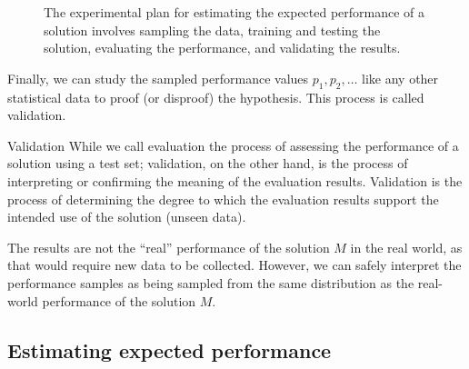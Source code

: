\begin{figure}
  \caption{
  The experimental plan for estimating the expected performance of a solution involves
  sampling the data, training and testing the solution, evaluating the performance, and
  validating the results.
  }
  \label{fig:plan-single}
\end{figure}

Finally, we can study the sampled performance values $p_1, p_2, \ldots$ like any other
statistical data to proof (or disproof) the hypothesis.  This process is called
validation.

\begin{definition}{Validation}\label{def:validation}
  While we call evaluation the process of assessing the performance of a solution using a
  test set; validation, on the other hand, is the process of interpreting or confirming
  the meaning of the evaluation results.  Validation is the process of determining the
  degree to which the evaluation results support the intended use of the solution (unseen
  data).
\end{definition}

The results are not the ``real'' performance of the solution
$M$ in the real world, as that would require new data to be collected.  However, we can
safely interpret the performance samples as being sampled from the same distribution as
the real-world performance of the solution $M$.


\subsection{Estimating expected performance}
\label{sub:expected-performance}

